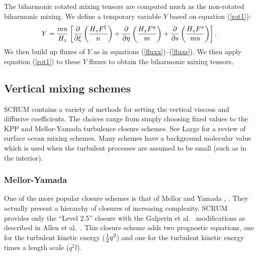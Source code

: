 The biharmonic rotated mixing tensors are computed much as the
non-rotated biharmonic mixing.  We define a temporary variable $Y$
based on equation (\ref{rot1}):
\begin{equation}
  Y = {mn \over H_z} \left[
  {\partial \over \partial \xi} \left( { H_z F^\xi \over n} \right) +
  {\partial \over \partial \eta} \left( { H_z F^\eta \over m} \right) +
  {\partial \over \partial s}
  \left( { H_z F^s \over mn} \right)
  \right] .
\end{equation}
We then build up fluxes of $Y$ as in equations
(\ref{fluxx})--(\ref{fluxs}).  We then apply equation (\ref{rot1})
to these $Y$ fluxes to obtain the biharmonic mixing tensors.

\subsection{Vertical mixing schemes}
\label{Vmix}
SCRUM contains a variety of methods for setting the vertical viscous and
diffusive coefficients. The choices range from simply choosing fixed
values to the KPP and Mellor-Yamada turbulence closure schemes.
See Large \cite{Large98} for a review of surface ocean mixing schemes.
Many schemes have a background molecular value which is used when the
turbulent processes are assumed to be small (such as in the interior).

\subsubsection{Mellor-Yamada}
One of the more popular closure schemes is that of Mellor and Yamada
\cite{Mellor74}, \cite{Mellor82}. They actually present a hierarchy of
closures of increasing complexity. SCRUM provides only the
``Level 2.5'' closure with the Galperin et al.\ \cite{Galperin88}
modifications as described in Allen et al.\ \cite{Allen95}.
This closure scheme adds two prognostic equations, one
for the turbulent kinetic energy (${1 \over 2} q^2$) and one for the
turbulent kinetic energy times a length scale ($q^2l$).

